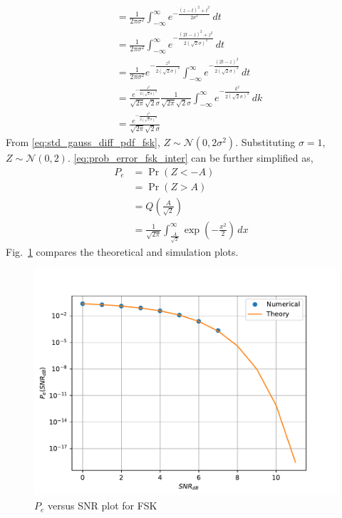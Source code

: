\documentclass[journal,8pt,onecolumn]{IEEEtran}
\newcommand\figref{Fig.~\ref}
\providecommand{\pr}[1]{\ensuremath{\Pr\left(#1\right)}}
\providecommand{\qfunc}[1]{\ensuremath{Q\left(#1\right)}}
\providecommand{\gauss}[2]{\mathcal{N}\ensuremath{\left(#1,#2\right)}}
\begin{document}
\begin{enumerate}
\begin{align}
	&= \frac{1}{2\pi\sigma^2}\int_{-\infty}^{\infty} e^{-\frac{(z-t)^2+t^2}{2\sigma^2}}  \,dt\\\nonumber
	&= \frac{1}{2\pi\sigma^2}\int_{-\infty}^{\infty} e^{-\frac{(2t-z)^2+z^2}{2(\sqrt{2}\sigma)^2}}  \,dt\\\nonumber
	&= \frac{1}{2\pi\sigma^2}e^{-\frac{z^2}{2(\sqrt{2}\sigma)^2}}\int_{-\infty}^{\infty} e^{-\frac{(2t-z)^2}{2(\sqrt{2}\sigma)^2}}  \,dt\\\nonumber
	&= \frac{e^{-\frac{z^2}{2(\sqrt{2}\sigma)^2}}}{\sqrt{2\pi}\sqrt{2}\sigma} \frac{1}{\sqrt{2\pi}\sqrt{2}\sigma}\int_{-\infty}^{\infty} e^{-\frac{k^2}{2(\sqrt{2}\sigma)^2}}  \,dk\\
	\label{eq:std_gauss_diff_pdf_fsk}
	&= \frac{e^{-\frac{z^2}{2(\sqrt{2}\sigma)^2}}}{\sqrt{2\pi}\sqrt{2}\sigma}
\end{align}
From \eqref{eq:std_gauss_diff_pdf_fsk}, $Z \sim \gauss{0}{2\sigma^2}$. Substituting $\sigma=1$, $Z \sim \gauss{0}{2}$. %
\eqref{eq:prob_error_fsk_inter} can be further simplified as,
\begin{align*}
	P_e &= \pr{Z < -A}&\\
	&= \pr{Z > A}&\\
	&= \qfunc{\frac{A}{\sqrt{2}}}&\\
	&= \frac{1}{\sqrt{2\pi}}\int_{\frac{A}{\sqrt{2}}}^{\infty} \exp\left(-\frac{x^2}{2}\right)  \,dx 
\end{align*}
\figref{fig:biv_pe_snr} compares the theoretical and simulation plots.

\begin{figure}[H]
\centering
\includegraphics[width=\columnwidth/2]{./figs/biv_pe_vs_snr.pdf}
\caption{$P_e$ versus SNR plot for FSK}
\label{fig:biv_pe_snr}
\end{figure}
%
\end{enumerate}
\end{document}
